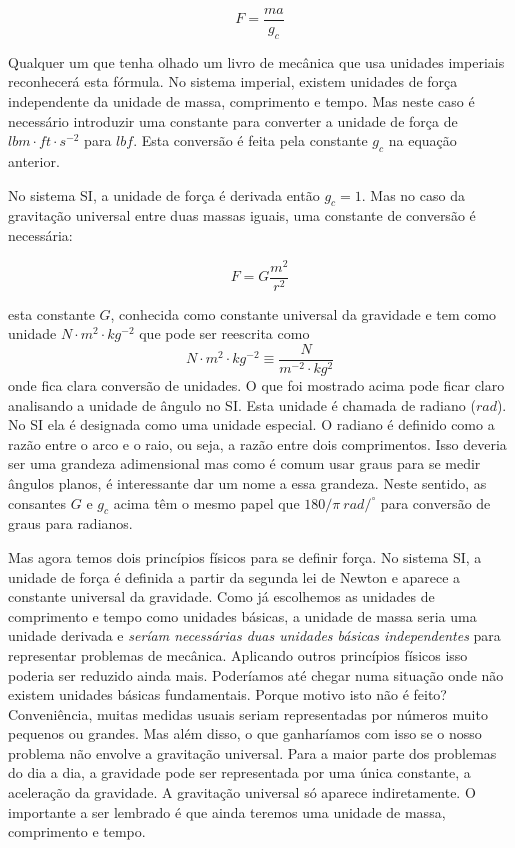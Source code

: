 \[
F = \frac{ma}{g_c}
\]

Qualquer um que tenha olhado um livro de mecânica que usa unidades imperiais reconhecerá esta fórmula. No sistema imperial, existem unidades de força independente da unidade de massa, comprimento e tempo. Mas neste caso é necessário introduzir uma constante para converter a unidade de força de $lbm\cdot ft \cdot s^{-2}$ para $lbf$. Esta conversão é feita pela constante $g_c$ na equação anterior.

No sistema SI, a unidade de força é derivada então $g_c = 1$. Mas no caso da gravitação universal entre duas massas iguais, uma constante de conversão é necessária:

\[
F = G \frac{m^2}{r^2}
\]

esta constante $G$, conhecida como constante universal da gravidade e tem como unidade $N\cdot m^2 \cdot kg^{-2}$ que pode ser reescrita como
\[
N\cdot m^2 \cdot kg^{-2} \equiv \frac{N}{m^{-2}\cdot kg^2}
\]
onde fica clara conversão de unidades. O que foi mostrado acima pode ficar claro analisando a unidade de ângulo no SI. Esta unidade é chamada de radiano ($rad$). No SI ela é designada como uma unidade especial. O radiano é definido como a razão entre o arco e o raio, ou seja, a razão entre dois comprimentos. Isso deveria ser uma grandeza adimensional mas como é comum usar graus para se medir ângulos planos, é interessante dar um nome a essa grandeza. Neste sentido, as consantes $G$ e $g_c$ acima têm o mesmo papel que $180/\pi\: rad/^\circ$ para conversão de graus para radianos.

Mas agora temos dois princípios físicos para se definir força. No sistema SI, a unidade de força é definida a partir da segunda lei de Newton e aparece a constante universal da gravidade. Como já escolhemos as unidades de comprimento e tempo como unidades básicas, a unidade de massa seria uma unidade derivada e \emph{seríam necessárias duas unidades básicas independentes} para representar problemas de mecânica. Aplicando outros princípios físicos isso poderia ser reduzido ainda mais. Poderíamos até chegar numa situação onde não existem unidades básicas fundamentais. Porque motivo isto não é feito? Conveniência, muitas medidas usuais seriam representadas por números muito pequenos ou grandes. Mas além disso, o que ganharíamos com isso se o nosso problema não envolve a gravitação universal. Para a maior parte dos problemas do dia a dia, a gravidade pode ser representada por uma única constante, a aceleração da gravidade. A gravitação universal só aparece indiretamente. O importante a ser lembrado é que ainda teremos uma unidade de massa, comprimento e tempo. 

